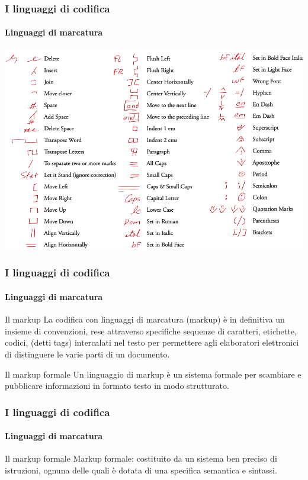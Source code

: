 \documentclass{beamer}
\begin{document}
\begin{frame}
	\frametitle{I linguaggi di codifica}
	\framesubtitle{Linguaggi di marcatura}
	\addtocounter{nframe}{1}

	\begin{center}
		\includegraphics[width=.8\textwidth]{imgs/MarkupConvention.png}
	\end{center}

\end{frame}

\begin{frame}
	\frametitle{I linguaggi di codifica}
	\framesubtitle{Linguaggi di marcatura}
	\addtocounter{nframe}{1}

	\begin{block}{Il markup}
		La codifica con linguaggi di marcatura (markup) è in definitiva un insieme di convenzioni, rese attraverso specifiche sequenze di caratteri, etichette, codici, (detti tags) intercalati nel testo per permettere agli elaboratori elettronici di distinguere le varie parti di un documento.
	\end{block}

	\begin{block}{Il markup formale}
		Un linguaggio di markup è un sistema formale per scambiare e pubblicare informazioni in formato testo in modo strutturato.
	\end{block}


\end{frame}

\begin{frame}
	\frametitle{I linguaggi di codifica}
	\framesubtitle{Linguaggi di marcatura}
	\addtocounter{nframe}{1}

	\begin{block}{Il markup formale}
		Markup formale: costituito da un sistema ben preciso di istruzioni, ognuna delle quali è dotata di una specifica semantica e sintassi.
	\end{block}


\end{frame}
\end{document}
